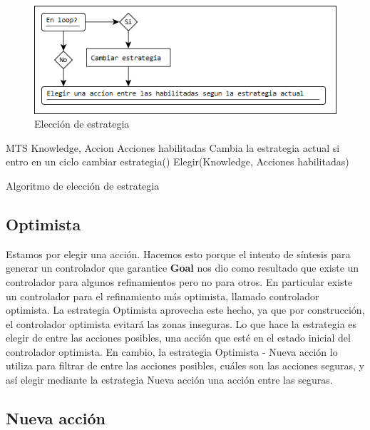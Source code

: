 \begin{figure}[H]
  \centering
    \includegraphics[scale=0.75]{Imagenes/Algoritmo/Algoritmo_elegir_1.png}
  \caption{Elección de estrategia}
  \label{fig:Algoritmo_elegir_1}
\end{figure}

\begin{algorithm}
\begin{algorithmic}
\REQUIRE MTS Knowledge, {Accion} Acciones habilitadas
\ENSURE Cambia la estrategia actual si entro en un ciclo
\STATE cambiar estrategia()
\ENDIF
\STATE Elegir(Knowledge, Acciones habilitadas)
\end{algorithmic}
\caption{Algoritmo de elección de estrategia}
\end{algorithm}


\subsection{Optimista}

Estamos por elegir una acción. Hacemos esto porque el intento de síntesis para generar un controlador que garantice \textbf{Goal} nos dio como resultado que 
existe un controlador para algunos refinamientos pero no para otros. En particular existe un controlador para el refinamiento más optimista, llamado 
controlador optimista. La estrategia Optimista aprovecha este hecho, ya que por construcción, el controlador optimista evitará las zonas inseguras. Lo que 
hace la estrategia es elegir de entre las acciones posibles, una acción que esté en el estado inicial del controlador optimista. En cambio, la estrategia 
Optimista - Nueva acción lo utiliza para filtrar de entre las acciones posibles, cuáles son las acciones seguras, y así elegir mediante la estrategia Nueva acción 
una acción entre las seguras.

\subsection{Nueva acción}

